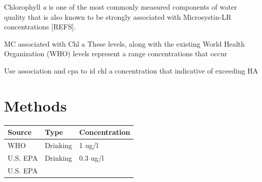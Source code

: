 \documentclass[11pt,]{article}
\begin{document}
Chlorophyll \emph{a} is one of the most commonly measured components of
water quality that is also known to be strongly associated with
Microsystin-LR concentrations {[}REFS{]}.

MC associated with Chl a These levels, along with the existing World
Health Organization (WHO) levels represent a range concentrations that
occur

Use association and cpa to id chl a concentration that indicative of
exceeding HA

\section{Methods}\label{methods}

\begin{longtable}[c]{@{}lll@{}}
\toprule
\begin{minipage}[b]{0.11\columnwidth}\raggedright\strut
Source
\strut\end{minipage} &
\begin{minipage}[b]{0.16\columnwidth}\raggedright\strut
Type
\strut\end{minipage} &
\begin{minipage}[b]{0.19\columnwidth}\raggedright\strut
Concentration
\strut\end{minipage}\tabularnewline
\midrule
\endhead
\begin{minipage}[t]{0.11\columnwidth}\raggedright\strut
WHO
\strut\end{minipage} &
\begin{minipage}[t]{0.16\columnwidth}\raggedright\strut
Drinking
\strut\end{minipage} &
\begin{minipage}[t]{0.19\columnwidth}\raggedright\strut
1 ug/l
\strut\end{minipage}\tabularnewline
\begin{minipage}[t]{0.11\columnwidth}\raggedright\strut
U.S. EPA
\strut\end{minipage} &
\begin{minipage}[t]{0.16\columnwidth}\raggedright\strut
Drinking
\strut\end{minipage} &
\begin{minipage}[t]{0.19\columnwidth}\raggedright\strut
0.3 ug/l
\strut\end{minipage}\tabularnewline
\begin{minipage}[t]{0.11\columnwidth}\raggedright\strut
U.S. EPA
\strut\end{minipage} &
\begin{minipage}[t]{0.16\columnwidth}\raggedright\strut

\end{minipage}
\end{longtable}
\end{document}
